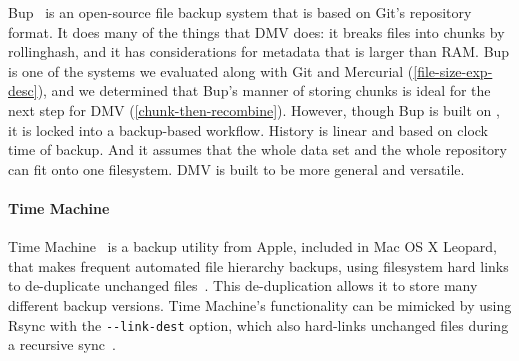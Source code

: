 Bup~\cite{bup_homepage} is an open-source file backup system that is based on Git's \gls{repository} format.
It does many of the things that \gls{DMV} does: it breaks files into chunks by \gls{rollinghash}, and it has considerations for metadata that is larger than RAM.
Bup is one of the systems we evaluated along with Git and Mercurial (\autoref{file-size-exp-desc}), and we determined that Bup's manner of storing chunks is ideal for the next step for \gls{DMV} (\autoref{chunk-then-recombine}).
However, though Bup is built on , it is locked into a backup-based workflow.
History is linear and based on clock time of backup.
And it assumes that the whole data set and the whole \gls{repository} can fit onto one filesystem.
\gls{DMV} is built to be more general and versatile.


\paragraph{Time Machine}

Time Machine~\cite{timemachine_patent} is a backup utility from Apple, included in Mac OS X Leopard, that makes frequent automated file hierarchy backups, using filesystem hard links to de-duplicate unchanged files~\cite{timemachine_magic}. This de-duplication allows it to store many different backup versions. Time Machine's functionality can be mimicked by using Rsync with the \lstinline{--link-dest} option, which also hard-links unchanged files during a recursive sync~\cite{timemachine_foreveryunix}.
